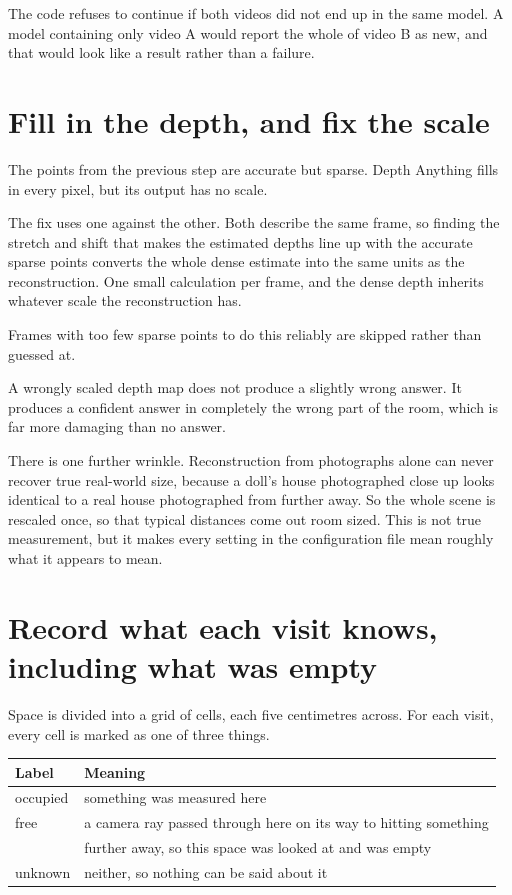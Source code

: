 The code refuses to continue if both videos did not end up in the same model. A model containing
only video A would report the whole of video B as new, and that would look like a result rather
than a failure.

\section{Fill in the depth, and fix the scale}

The points from the previous step are accurate but sparse. Depth Anything fills in every pixel, but
its output has no scale.

The fix uses one against the other. Both describe the same frame, so finding the stretch and shift
that makes the estimated depths line up with the accurate sparse points converts the whole dense
estimate into the same units as the reconstruction. One small calculation per frame, and the dense
depth inherits whatever scale the reconstruction has.

Frames with too few sparse points to do this reliably are skipped rather than guessed at.

\begin{watch}
A wrongly scaled depth map does not produce a slightly wrong answer. It produces a confident answer
in completely the wrong part of the room, which is far more damaging than no answer.
\end{watch}

There is one further wrinkle. Reconstruction from photographs alone can never recover true
real-world size, because a doll's house photographed close up looks identical to a real house
photographed from further away. So the whole scene is rescaled once, so that typical distances come
out room sized. This is not true measurement, but it makes every setting in the configuration file
mean roughly what it appears to mean.

\section{Record what each visit knows, including what was empty}

Space is divided into a grid of cells, each five centimetres across. For each visit, every cell is
marked as one of three things.

\begin{center}
\begin{tabular}{@{}ll@{}}
\toprule
\textbf{Label} & \textbf{Meaning} \\
\midrule
occupied & something was measured here \\
free & a camera ray passed through here on its way to hitting something \\
 & further away, so this space was looked at and was empty \\
unknown & neither, so nothing can be said about it \\
\bottomrule
\end{tabular}
\end{center}

